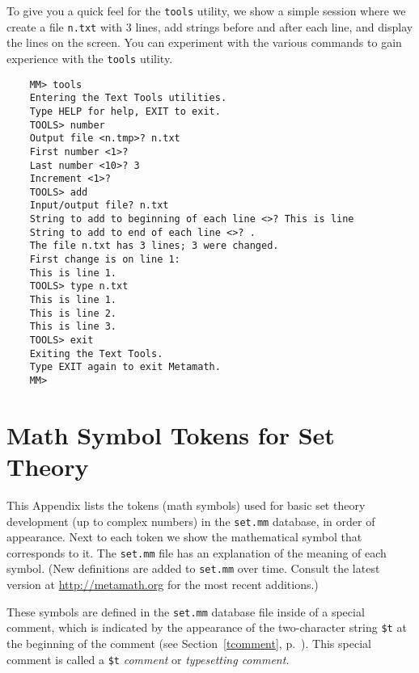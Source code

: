 To give you a quick feel for the \texttt{tools} utility, we show a
simple session where we create a file \texttt{n.txt} with 3 lines, add
strings before and after each line, and display the lines on the screen.
You can experiment with the various commands to gain experience with the
\texttt{tools} utility.

\begin{verbatim}
    MM> tools
    Entering the Text Tools utilities.
    Type HELP for help, EXIT to exit.
    TOOLS> number
    Output file <n.tmp>? n.txt
    First number <1>?
    Last number <10>? 3
    Increment <1>?
    TOOLS> add
    Input/output file? n.txt
    String to add to beginning of each line <>? This is line
    String to add to end of each line <>? .
    The file n.txt has 3 lines; 3 were changed.
    First change is on line 1:
    This is line 1.
    TOOLS> type n.txt
    This is line 1.
    This is line 2.
    This is line 3.
    TOOLS> exit
    Exiting the Text Tools.
    Type EXIT again to exit Metamath.
    MM>
\end{verbatim}



\appendix
\chapter{Math Symbol Tokens for Set Theory}
\label{ASCII}

This Appendix lists the tokens (math symbols) used for basic set theory
development (up to complex numbers) in the \texttt{set.mm} database, in
order of appearance.  Next to each token we show the mathematical symbol
that corresponds to it.  The
\texttt{set.mm} file has an
explanation of the meaning of each symbol.  (New definitions are added
to \texttt{set.mm} over time.  Consult the latest version at
\url{http://metamath.org} for the most recent additions.)

These symbols are defined in the \texttt{set.mm} database file inside of
a special comment, which is indicated by the appearance of the
two-character string \texttt{\$t} at the beginning of the comment
(see Section~\ref{tcomment}, p.~\pageref{tcomment}).  This
special comment is called a \texttt{\$t} {\em
comment} or {\em typesetting
comment.}

